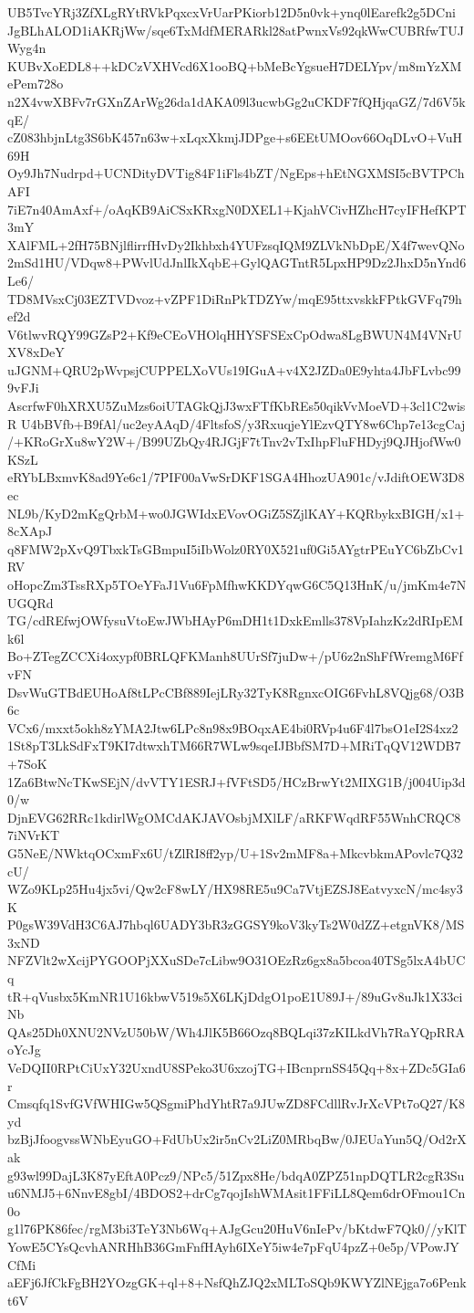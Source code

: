 UB5TvcYRj3ZfXLgRYtRVkPqxcxVrUarPKiorb12D5n0vk+ynq0lEarefk2g5DCni
JgBLhALOD1iAKRjWw/sqe6TxMdfMERARkl28atPwnxVs92qkWwCUBRfwTUJWyg4n
KUBvXoEDL8++kDCzVXHVcd6X1ooBQ+bMeBcYgsueH7DELYpv/m8mYzXMePem728o
n2X4vwXBFv7rGXnZArWg26da1dAKA09l3ucwbGg2uCKDF7fQHjqaGZ/7d6V5kqE/
cZ083hbjnLtg3S6bK457n63w+xLqxXkmjJDPge+s6EEtUMOov66OqDLvO+VuH69H
Oy9Jh7Nudrpd+UCNDityDVTig84F1iFls4bZT/NgEps+hEtNGXMSI5cBVTPChAFI
7iE7n40AmAxf+/oAqKB9AiCSxKRxgN0DXEL1+KjahVCivHZhcH7cyIFHefKPT3mY
XAlFML+2fH75BNjlflirrfHvDy2Ikhbxh4YUFzsqIQM9ZLVkNbDpE/X4f7wevQNo
2mSd1HU/VDqw8+PWvlUdJnlIkXqbE+GylQAGTntR5LpxHP9Dz2JhxD5nYnd6Le6/
TD8MVsxCj03EZTVDvoz+vZPF1DiRnPkTDZYw/mqE95ttxvskkFPtkGVFq79hef2d
V6tlwvRQY99GZsP2+Kf9eCEoVHOlqHHYSFSExCpOdwa8LgBWUN4M4VNrUXV8xDeY
uJGNM+QRU2pWvpsjCUPPELXoVUs19IGuA+v4X2JZDa0E9yhta4JbFLvbc999vFJi
AscrfwF0hXRXU5ZuMzs6oiUTAGkQjJ3wxFTfKbREs50qikVvMoeVD+3cl1C2wisR
U4bBVfb+B9fAl/uc2eyAAqD/4FltsfoS/y3RxuqjeYlEzvQTY8w6Chp7e13cgCaj
/+KRoGrXu8wY2W+/B99UZbQy4RJGjF7tTnv2vTxIhpFluFHDyj9QJHjofWw0KSzL
eRYbLBxmvK8ad9Ye6c1/7PIF00aVwSrDKF1SGA4HhozUA901c/vJdiftOEW3D8ec
NL9b/KyD2mKgQrbM+wo0JGWIdxEVovOGiZ5SZjlKAY+KQRbykxBIGH/x1+8cXApJ
q8FMW2pXvQ9TbxkTsGBmpuI5iIbWolz0RY0X521uf0Gi5AYgtrPEuYC6bZbCv1RV
oHopcZm3TssRXp5TOeYFaJ1Vu6FpMfhwKKDYqwG6C5Q13HnK/u/jmKm4e7NUGQRd
TG/cdREfwjOWfysuVtoEwJWbHAyP6mDH1t1DxkEmlls378VpIahzKz2dRIpEMk6l
Bo+ZTegZCCXi4oxypf0BRLQFKManh8UUrSf7juDw+/pU6z2nShFfWremgM6FfvFN
DsvWuGTBdEUHoAf8tLPcCBf889IejLRy32TyK8RgnxcOIG6FvhL8VQjg68/O3B6c
VCx6/mxxt5okh8zYMA2Jtw6LPc8n98x9BOqxAE4bi0RVp4u6F4l7bsO1eI2S4xz2
1St8pT3LkSdFxT9KI7dtwxhTM66R7WLw9sqeIJBbfSM7D+MRiTqQV12WDB7+7SoK
1Za6BtwNcTKwSEjN/dvVTY1ESRJ+fVFtSD5/HCzBrwYt2MIXG1B/j004Uip3d0/w
DjnEVG62RRc1kdirlWgOMCdAKJAVOsbjMXlLF/aRKFWqdRF55WnhCRQC87iNVrKT
G5NeE/NWktqOCxmFx6U/tZlRI8ff2yp/U+1Sv2mMF8a+MkcvbkmAPovlc7Q32cU/
WZo9KLp25Hu4jx5vi/Qw2cF8wLY/HX98RE5u9Ca7VtjEZSJ8EatvyxcN/mc4sy3K
P0gsW39VdH3C6AJ7hbql6UADY3bR3zGGSY9koV3kyTs2W0dZZ+etgnVK8/MS3xND
NFZVlt2wXcijPYGOOPjXXuSDe7cLibw9O31OEzRz6gx8a5bcoa40TSg5lxA4bUCq
tR+qVusbx5KmNR1U16kbwV519s5X6LKjDdgO1poE1U89J+/89uGv8uJk1X33ciNb
QAs25Dh0XNU2NVzU50bW/Wh4JlK5B66Ozq8BQLqi37zKILkdVh7RaYQpRRAoYcJg
VeDQII0RPtCiUxY32UxndU8SPeko3U6xzojTG+IBcnprnSS45Qq+8x+ZDc5GIa6r
Cmsqfq1SvfGVfWHIGw5QSgmiPhdYhtR7a9JUwZD8FCdllRvJrXcVPt7oQ27/K8yd
bzBjJfoogvssWNbEyuGO+FdUbUx2ir5nCv2LiZ0MRbqBw/0JEUaYun5Q/Od2rXak
g93wl99DajL3K87yEftA0Pcz9/NPc5/51Zpx8He/bdqA0ZPZ51npDQTLR2cgR3Su
u6NMJ5+6NnvE8gbI/4BDOS2+drCg7qojIshWMAsit1FFiLL8Qem6drOFmou1Cn0o
g1l76PK86fec/rgM3bi3TeY3Nb6Wq+AJgGcu20HuV6nIePv/bKtdwF7Qk0//yKlT
YowE5CYsQcvhANRHhB36GmFnfHAyh6IXeY5iw4e7pFqU4pzZ+0e5p/VPowJYCfMi
aEFj6JfCkFgBH2YOzgGK+ql+8+NsfQhZJQ2xMLToSQb9KWYZlNEjga7o6Penkt6V
